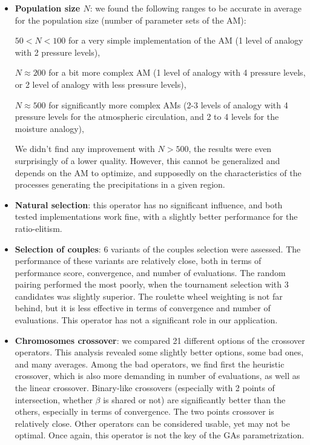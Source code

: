 \documentclass[twocol]{ametsoc}
\begin{document}
\begin{itemize}
	\item \textbf{Population size $N$}: we found the following ranges to be accurate in average for the population size (number of parameter sets of the AM):
	
	$50<N<100$ for a very simple implementation of the AM (1 level of analogy with 2 pressure levels),
	
	$N\approx200$ for a bit more complex AM (1 level of analogy with 4 pressure levels, or 2 level of analogy with less pressure levels),
	
	$N\approx500$ for significantly more complex AMs (2-3 levels of analogy with 4 pressure levels for the atmospheric circulation, and 2 to 4 levels for the moisture analogy),
	
	We didn't find any improvement with $N>500$, the results were even surprisingly of a lower quality. However, this cannot be generalized and depends on the AM to optimize, and supposedly on the characteristics of the processes generating the precipitations in a given region. 
	
	\item \textbf{Natural selection}: this operator has no significant influence, and both tested implementations work fine, with a slightly better performance for the ratio-elitism.
	
	\item \textbf{Selection of couples}: 6 variants of the couples selection were assessed. The performance of these variants are relatively close, both in terms of performance score, convergence, and number of evaluations. The random pairing performed the most poorly, when the tournament selection with 3 candidates was slightly superior. The roulette wheel weighting is not far behind, but it is less effective in terms of convergence and number of evaluations. This operator has not a significant role in our application. 
	
	\item \textbf{Chromosomes crossover}: we compared 21 different options of the crossover operators. This analysis revealed some slightly better options, some bad ones, and many averages. Among the bad operators, we find first the heuristic crossover, which is also more demanding in number of evaluations, as well as the linear crossover. Binary-like crossovers (especially with 2 points of intersection, whether $\beta$ is shared or not) are significantly better than the others, especially in terms of convergence. The two points crossover is relatively close. Other operators can be considered usable, yet may not be optimal. Once again, this operator is not the key of the GAs parametrization.
	

\end{itemize}
\end{document}
